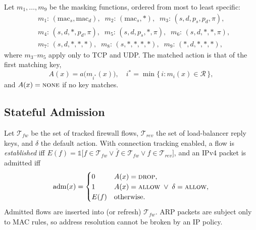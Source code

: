 \documentclass[conference]{IEEEtran}
\begin{document}
Let $m_1,\dots,m_9$ be the masking functions, ordered from most to least
specific:
\begin{equation}
\begin{aligned}
&m_1{:}\,(\mathrm{mac}_s,\mathrm{mac}_d),\;\; m_2{:}\,(\mathrm{mac}_s,*),\;\;
 m_3{:}\,(s,d,p_s,p_d,\pi),\\
&m_4{:}\,(s,d,*,p_d,\pi),\;\; m_5{:}\,(s,d,p_s,*,\pi),\;\;
 m_6{:}\,(s,d,*,*,\pi),\\
&m_7{:}\,(s,d,*,*,*),\;\; m_8{:}\,(s,*,*,*,*),\;\; m_9{:}\,(*,d,*,*,*),
\end{aligned}
\end{equation}
where $m_3$--$m_5$ apply only to TCP and UDP. The matched action is that of
the first matching key,
\begin{equation}
\label{eq:match}
A(x) = a\big(m_{i^*}(x)\big),\quad
i^* = \min\{\, i : m_i(x) \in \mathcal{R} \,\},
\end{equation}
and $A(x)=\textsc{none}$ if no key matches.

\subsection{Stateful Admission}
Let $\mathcal{T}_{fw}$ be the set of tracked firewall flows, $\mathcal{T}_{rev}$
the set of load-balancer reply keys, and $\delta$ the default action. With
connection tracking enabled, a flow is \textit{established} iff
$E(f) = \mathbb{1}\big[f \in \mathcal{T}_{fw} \lor \bar f \in \mathcal{T}_{fw}
\lor f \in \mathcal{T}_{rev}\big]$, and an IPv4 packet is admitted iff
\begin{equation}
\label{eq:adm}
\mathrm{adm}(x) =
\begin{cases}
0 & A(x) = \textsc{drop},\\
1 & A(x) = \textsc{allow} \;\lor\; \delta=\textsc{allow},\\
E(f) & \text{otherwise}.
\end{cases}
\end{equation}
Admitted flows are inserted into (or refresh) $\mathcal{T}_{fw}$. ARP packets
are subject only to MAC rules, so address resolution cannot be broken by an
IP policy.
\end{document}
